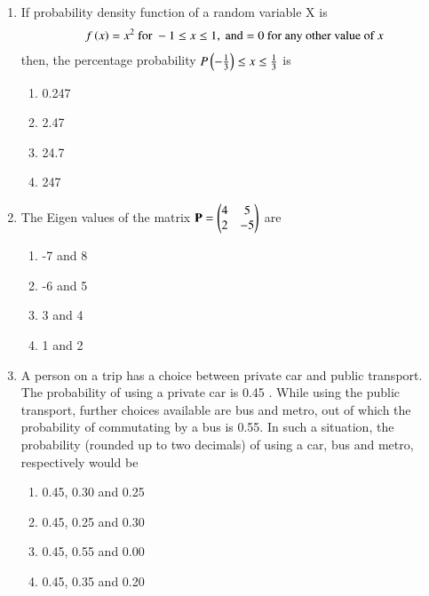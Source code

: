 \documentclass[journal]{IEEEtran}
\begin{document}
\begin{enumerate}
\item If probability density function of a random variable X is 
\begin{align*}
    f\left(x\right) = x^2 \text{ for } -1 \leq x \leq 1, \text{ and}
     = 0 \text{ for any other value of $x$}
\end{align*}
then, the percentage probability $P\left(-\frac{1}{3}\right) \leq x \leq \frac{1}{3}$ is
\begin{multicols}{2}
    \begin{enumerate}
        \item 0.247
        \item 2.47
        \item 24.7
        \item 247
    \end{enumerate}
\end{multicols}

\item The Eigen values of the matrix $\mathbf{P} = \begin{pmatrix}4 & 5 \\ 2 & -5\end{pmatrix}$ are
\begin{multicols}{2}
    \begin{enumerate}
        \item -7 and 8
        \item -6 and 5
        \item 3 and 4
        \item 1 and 2
    \end{enumerate}
\end{multicols}

\item A person on a trip has a choice between private car and public transport. The probability of using a private car is 0.45 . While using the public transport, further choices available are bus and metro, out of which the probability of commutating by a bus is 0.55. In such a situation, the probability (rounded up to two decimals) of using a car, bus and metro, respectively would be
\begin{multicols}{2}
    \begin{enumerate}
        \item 0.45, 0.30 and 0.25
        \item 0.45, 0.25 and 0.30
        \item 0.45, 0.55 and 0.00
        \item 0.45, 0.35 and 0.20
    \end{enumerate}
\end{multicols}


\end{enumerate}
\end{document}
